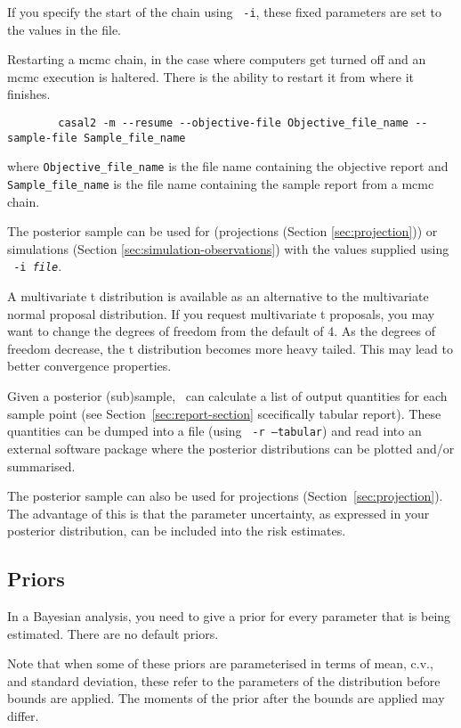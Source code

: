 If you specify the start of the chain using \texttt{\cname\ -i}, these fixed parameters are set to the values in the file.

Restarting a mcmc chain, in the case where computers get turned off and an mcmc execution is haltered. There is the ability to restart it from where it finishes. 

{\small{\begin{verbatim}
		casal2 -m --resume --objective-file Objective_file_name --sample-file Sample_file_name
		\end{verbatim}}}
where \texttt{Objective\_file\_name} is the file name containing the objective report and \texttt{Sample\_file\_name} is the file name containing the sample report from a mcmc chain.


The posterior sample can be used for (projections (Section \ref{sec:projection})) or simulations (Section \ref{sec:simulation-observations}) with the values supplied using \texttt{\cname\ -i \emph{file}}.


A multivariate t distribution is available as an alternative to the multivariate normal proposal distribution. If you request multivariate t proposals, you may want to change the degrees of freedom from the default of 4. As the degrees of freedom decrease, the t distribution becomes more heavy tailed. This may lead to better convergence properties.


Given a posterior (sub)sample, \CNAME\ can calculate a list of output quantities for each sample point (see Section~\ref{sec:report-section} scecifically tabular report). These quantities can be dumped into a file (using \texttt{\cname\ -r --tabular}) and read into an external software package where the posterior distributions can be plotted and/or summarised. 

The posterior sample can also be used for projections (Section~\ref{sec:projection}). The advantage of this is that the parameter uncertainty, as expressed in your posterior distribution, can be included into the risk estimates.

\subsection{Priors\label{sec:priors}}

In a Bayesian analysis, you need to give a prior for every parameter that is being estimated. There are no default priors.  

Note that when some of these priors are parameterised in terms of mean, c.v., and standard deviation, these refer to the parameters of the distribution before bounds are applied. The moments of the prior after the bounds are applied may differ.

